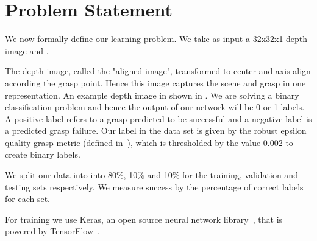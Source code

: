 
\section{Problem Statement}
\label{sec:problem}

We now formally define our learning problem. 
We take as input a 32x32x1 depth image and . 

The depth image, called the "aligned image", transformed to center and axis align according the grasp point. 
Hence this image captures the scene and grasp in one representation. 
An example depth image in shown in . 
We are solving a binary classification problem and hence the output of our network will be 0 or 1 labels. 
A positive label refers to a grasp predicted to be successful and a negative label is a predicted grasp failure. 
Our label in the data set is given by the robust epsilon quality grasp metric (defined in~\cite{seita2016large}), which is thresholded by the value 0.002 to create binary labels.

We split our data into into 80\%, 10\% and 10\% for the training, validation and testing sets respectively.
We measure success by the percentage of correct labels for each set. 

For training we use Keras, an open source neural network library~\cite{chollet2017keras}, that is powered by TensorFlow~\cite{abadi2016tensorflow}. 
